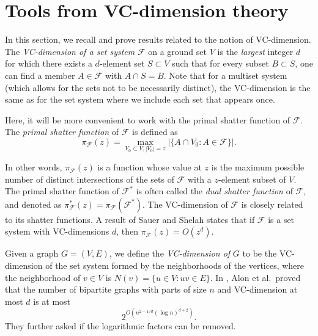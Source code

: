 \documentclass[11pt]{article}
\theoremstyle{plain}
\theoremstyle{definition}
\theoremstyle{remark}
\begin{document}
\medskip
 


 
 


 













\section{Tools from VC-dimension theory}\label{secvc}

 In this section, we recall and prove results related to the notion of VC-dimension.   The {\em VC-dimension of a set system} $\mathcal{F}$ on a ground set $V$ is the {\em largest} integer $d$ for which there exists a $d$-element set $S\subset V$ such that for every subset $B\subset S$, one can find a member $A\in \mathcal{F}$ with $A\cap S=B$. Note that for a multiset system (which allows for the sets not to be necessarily distinct), the VC-dimension is the same as for the set system where we include each set that appears once.   

 Here, it will be more convenient to work with the primal shatter function of $\mathcal{F}$. The \emph{primal shatter function} of $\mathcal{F}$ is defined as $$\pi_{\mathcal{F}}(z) =  \max_{V_0 \subset V, |V_0| = z} |\{ A\cap V_0: A \in \mathcal{F}\}|.$$
 
\noindent In other words, $\pi_{\mathcal{F}}(z)$ is a function whose value at $z$ is the maximum possible number of distinct
intersections of the sets of $\mathcal{F}$ with a $z$-element subset of $V$. The primal shatter function of $\mathcal{F}^{\ast}$ is
often called the \emph{dual shatter function} of $\mathcal{F}$, and denoted as $\pi^{\ast}_{\mathcal{F}}(z) = \pi_{\mathcal{F}}(\mathcal{F}^{\ast})$.
The VC-dimension of $\mathcal{F}$ is closely related to its shatter functions. A result of Sauer and Shelah \cite{Sa,S}
states that if $\mathcal{F}$ is a set system with VC-dimensions $d$, then $\pi_{\mathcal{F}}(z)  = O(z^d)$.

Given a graph $G = (V,E)$, we define the {\em VC-dimension of} $G$ to be the VC-dimension of the set system formed by the neighborhoods of the vertices, where the neighborhood of $v\in V$ is $N(v)=\{u\in V : uv\in E\}$. In \cite{alon}, Alon et al.~proved that the number of bipartite graphs with parts of size $n$ and VC-dimension at most $d$ is at most 
$$2^{O(n^{2 - 1/d}(\log n)^{d + 2})}.$$
They further asked if the logarithmic factors can be removed.
\end{document}
